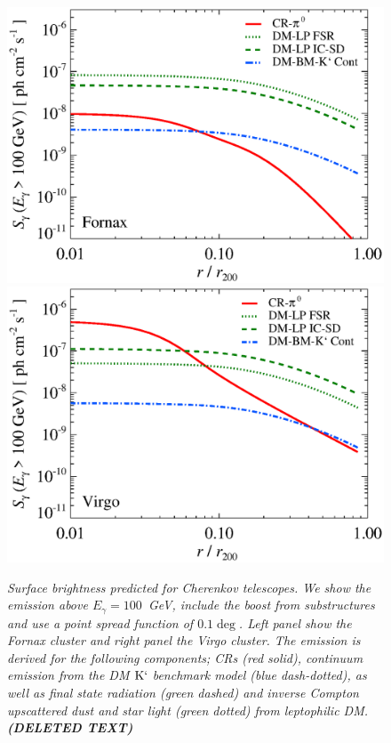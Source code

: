 \documentclass[10pt,aps,pra,reprint,amsmath,amsfonts,amssymb,showpacs]{revtex4-1}
\def\del#1{{\bf (DELETED TEXT)}}
\newcommand{\rmn}{\mathrm}
\newcommand{\eg}{E_\gamma}
\newcommand{\Km}{\rmn{K}`}
\begin{document}
\begin{figure}
\begin{minipage}{2.0\columnwidth}
  \includegraphics[width=0.49\columnwidth]{figures/SB.Fornax.v8.SF300.SubMass.elmu.eps}
  \includegraphics[width=0.49\columnwidth]{figures/SB.Virgo.v8.SF300.SubMass.elmu.eps}
\caption{\it Surface brightness predicted for Cherenkov telescopes. We
  show the emission above $\eg=100$~GeV, include the boost from
  substructures and use a point spread function of $0.1\deg$. Left
  panel show the Fornax cluster and right panel the Virgo cluster. The
  emission is derived for the following components; CRs (red solid),
  continuum emission from the DM $\Km$ benchmark model (blue
  dash-dotted), as well as final state radiation (green dashed) and
  inverse Compton upscattered dust and star light (green dotted) from
  leptophilic DM. \del{GeV energies give rise to small BM model fluxes
    but high LP fluxes, other words BM models good for Cerenkov
    telescopes and LP good for Fermi (although the flat LP spectra
    give rise to high fluxes at high energies as well).}}
 \label{fig13}
\end{minipage}
\end{figure}
\end{document}
